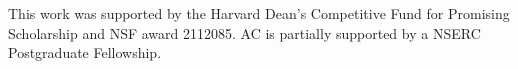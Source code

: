 \documentclass[sn-nature]{sn-jnl}%
\theoremstyle{thmstyleone}%
\theoremstyle{thmstyletwo}%
\theoremstyle{thmstylethree}%
\begin{document}
\noindent This work was supported by the Harvard Dean’s Competitive Fund for Promising Scholarship and NSF award 2112085. AC is partially supported by a NSERC Postgraduate Fellowship.


% 


\newpage












\end{document}
